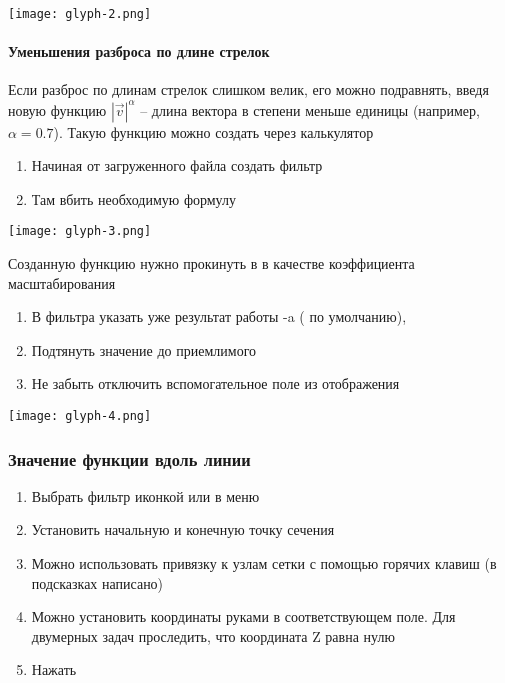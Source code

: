 \begin{center}
\texttt{[image: glyph-2.png]}
\end{center}

\paragraph{Уменьшения разброса по длине стрелок}
Если разброс по длинам стрелок слишком велик, его можно подравнять,
введя новую функцию $|\vec v|^{\alpha}$ -- длина вектора в степени меньше единицы (например, $\alpha=0.7$).
Такую функцию можно создать через калькулятор

\begin{enumerate}
\item Начиная от загруженного файла создать фильтр 
\item Там вбить необходимую формулу
\end{enumerate}
\begin{center}
\texttt{[image: glyph-3.png]}
\end{center}
Созданную функцию нужно прокинуть в  в качестве коэффициента масштабирования
\begin{enumerate}
\item В  фильтра  указать уже результат работы -a ( по умолчанию),
\item Подтянуть значение  до приемлимого
\item Не забыть отключить вспомогательное поле  из отображения
\end{enumerate}
\begin{center}
\texttt{[image: glyph-4.png]}
\end{center}

\subsubsection{Значение функции вдоль линии}
\label{sec:paraview-plot-over-line}

\begin{enumerate}
\item
Выбрать фильтр  иконкой или в меню 
\item
Установить начальную и конечную точку сечения
\item
Можно использовать привязку к узлам сетки с помощью горячих клавиш (в подсказках написано)
\item
Можно установить координаты руками в соответствующем поле. Для двумерных задач проследить,
что координата Z равна нулю
\item
Нажать 
\end{enumerate}

